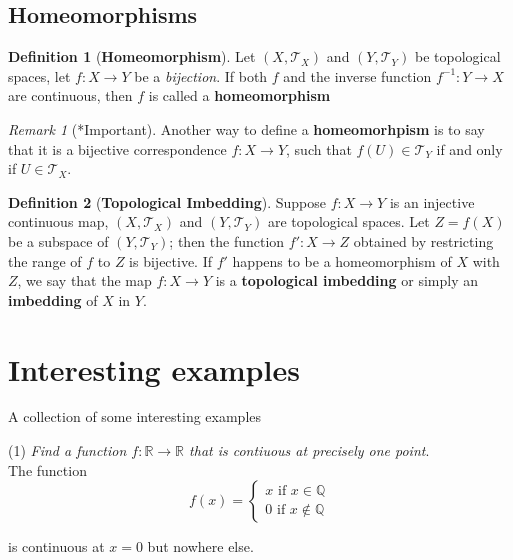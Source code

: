 \documentclass{article}
\theoremstyle{remark}
\newtheorem*{remark}{Remark}
\theoremstyle{definition}
\newtheorem{definition}{Definition}[section]
\begin{document}
\bigskip

\subsection{Homeomorphisms}

\begin{definition}[\textbf{Homeomorphism}]


Let $(X, \mathcal{T}_X)$ and $(Y, \mathcal{T}_Y)$ be topological spaces, let $f : X \to Y$ be a \textit{bijection}. If both $f$ and the inverse function $f^{-1} : Y \to X$ are continuous, then $f$ is called a \textbf{homeomorphism}
\end{definition}

\begin{remark}[*Important]
Another way to define a \textbf{homeomorhpism} is to say that it is a bijective correspondence $f : X \to Y$, such that $f(U) \in \mathcal{T}_Y$ if and only if $U \in \mathcal{T}_X$.
\end{remark}

\begin{definition}[\textbf{Topological Imbedding}]
Suppose $f: X \to Y$ is an injective continuous map, $(X, \mathcal{T}_X)$ and $(Y, \mathcal{T}_Y)$ are topological spaces. Let $Z = f(X)$ be a subspace of  $(Y, \mathcal{T}_Y)$; then the function $f' : X \to Z$ obtained by restricting the range of $f$ to $Z$ is bijective. If $f'$ happens to be a homeomorphism of $X$ with $Z$, we say that the map $f: X \to Y$ is a \textbf{topological imbedding} or simply an \textbf{imbedding} of $X$ in $Y$.
\end{definition}

\newpage

\section{Interesting examples}

A collection of some interesting examples

\hrulefill


(1) \textit{Find a function $f: \mathbb{R} \to \mathbb{R}$ that is contiuous at precisely one point}. \\

The function
$$f(x)=\begin{cases}
x\text{ if }x\in\mathbb{Q}\\
0\text{ if }x\not\in\mathbb{Q}
\end{cases}$$

is continuous at $x=0$ but nowhere else.
\end{document}
